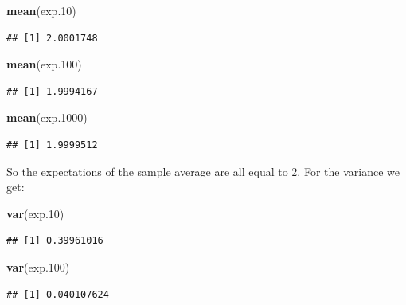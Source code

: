 \documentclass[]{krantz}
\makeatletter
\newenvironment{Shaded}{\begin{snugshade}}{\end{snugshade}}
\newcommand{\KeywordTok}[1]{\textcolor[rgb]{0.13,0.29,0.53}{\textbf{#1}}}
\newcommand{\DecValTok}[1]{\textcolor[rgb]{0.00,0.00,0.81}{#1}}
\newcommand{\NormalTok}[1]{#1}
\newenvironment{kframe}{%
\medskip{}
\setlength{\fboxsep}{.8em}
 \def\at@end@of@kframe{}%
 \ifinner\ifhmode%
  \def\at@end@of@kframe{\end{minipage}}%
  \begin{minipage}{\columnwidth}%
 \fi\fi%
 \def\FrameCommand##1{\hskip\@totalleftmargin \hskip-\fboxsep
 \colorbox{shadecolor}{##1}\hskip-\fboxsep
     \hskip-\linewidth \hskip-\@totalleftmargin \hskip\columnwidth}%
 \MakeFramed {\advance\hsize-\width
   \@totalleftmargin\z@ \linewidth\hsize
   \@setminipage}}%
 {\par\unskip\endMakeFramed%
 \at@end@of@kframe}
\renewenvironment{Shaded}{\begin{kframe}}{\end{kframe}}
\theoremstyle{definition}
\theoremstyle{definition}
\theoremstyle{definition}
\theoremstyle{remark}
\makeatother
\begin{document}
\begin{Shaded}
\begin{Highlighting}[]
\KeywordTok{mean}\NormalTok{(exp.}\DecValTok{10}\NormalTok{)}
\end{Highlighting}
\end{Shaded}

\begin{verbatim}
## [1] 2.0001748
\end{verbatim}

\begin{Shaded}
\begin{Highlighting}[]
\KeywordTok{mean}\NormalTok{(exp.}\DecValTok{100}\NormalTok{)}
\end{Highlighting}
\end{Shaded}

\begin{verbatim}
## [1] 1.9994167
\end{verbatim}

\begin{Shaded}
\begin{Highlighting}[]
\KeywordTok{mean}\NormalTok{(exp.}\DecValTok{1000}\NormalTok{)}
\end{Highlighting}
\end{Shaded}

\begin{verbatim}
## [1] 1.9999512
\end{verbatim}

So the expectations of the sample average are all equal to 2. For the
variance we get:

\begin{Shaded}
\begin{Highlighting}[]
\KeywordTok{var}\NormalTok{(exp.}\DecValTok{10}\NormalTok{)}
\end{Highlighting}
\end{Shaded}

\begin{verbatim}
## [1] 0.39961016
\end{verbatim}

\begin{Shaded}
\begin{Highlighting}[]
\KeywordTok{var}\NormalTok{(exp.}\DecValTok{100}\NormalTok{)}
\end{Highlighting}
\end{Shaded}

\begin{verbatim}
## [1] 0.040107624
\end{verbatim}
\end{document}
